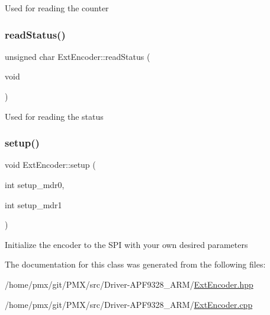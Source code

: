 Used for reading the counter \mbox{\label{classExtEncoder_a360d4cc96d0d348082a6e4ab0db59015}} 
\subsubsection{\texorpdfstring{read\+Status()}{readStatus()}}
{\footnotesize\ttfamily unsigned char Ext\+Encoder\+::read\+Status (\begin{DoxyParamCaption}\item[{void}]{ }\end{DoxyParamCaption})}

Used for reading the status \mbox{\label{classExtEncoder_ac199458c972f5fb241cedc0941ab3a95}} 
\subsubsection{\texorpdfstring{setup()}{setup()}}
{\footnotesize\ttfamily void Ext\+Encoder\+::setup (\begin{DoxyParamCaption}\item[{int}]{setup\+\_\+mdr0,  }\item[{int}]{setup\+\_\+mdr1 }\end{DoxyParamCaption})}

Initialize the encoder to the S\+PI with your own desired parameters 

The documentation for this class was generated from the following files\+:\begin{DoxyCompactItemize}
\item 
/home/pmx/git/\+P\+M\+X/src/\+Driver-\/\+A\+P\+F9328\+\_\+\+A\+R\+M/\hyperlink{ExtEncoder_8hpp}{Ext\+Encoder.\+hpp}\item 
/home/pmx/git/\+P\+M\+X/src/\+Driver-\/\+A\+P\+F9328\+\_\+\+A\+R\+M/\hyperlink{ExtEncoder_8cpp}{Ext\+Encoder.\+cpp}\end{DoxyCompactItemize}
